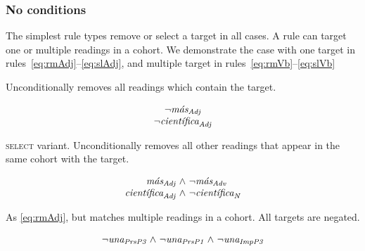 \subsubsection{No conditions} 

The simplest rule types remove or select a target in all cases. 
A rule can target one or multiple readings in a cohort. We demonstrate the case with one target in rules~\ref{eq:rmAdj}--\ref{eq:slAdj}, and multiple target in rules~\ref{eq:rmVb}--\ref{eq:slVb}


 Unconditionally removes all readings which contain the target.

\begin{equation}
\begin{array}{c}
\neg{}\masAdj \\
\neg{}\cientificaAdj
\end{array}
\label{eq:rmAdj}
\end{equation}

 \textsc{select} variant. Unconditionally removes all other readings that appear in the same cohort with the target.

\begin{equation}
\begin{array}{r @{~\wedge~} l }
\masAdj        & \neg{}\masAdv \\
\cientificaAdj & \neg{}\cientificaN \\
\end{array}
\label{eq:slAdj}
\end{equation}



 As \ref{eq:rmAdj}, but matches multiple readings in a cohort. All targets are negated.

\begin{equation}
\begin{array}{c @{~\wedge~} c @{~\wedge~} c}
\neg{} \unaPrsPThree  & \neg \unaPrsPOne & \neg \unaImp
\end{array}
\label{eq:rmVb}
\end{equation}

